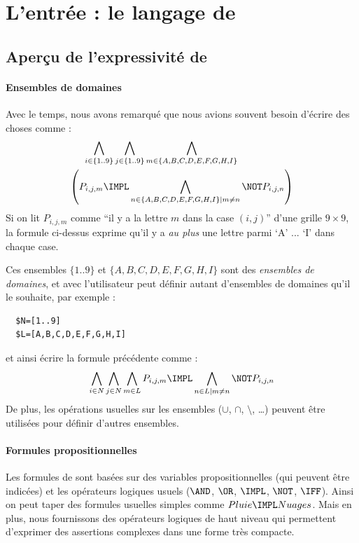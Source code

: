 \section{L'entrée : le langage de \touist}
\subsection{Aperçu de l'expressivité de \touist\label{sec:sat_tobedone}}

\paragraph{Ensembles de domaines}
Avec le temps, nous avons remarqué que nous avions souvent besoin d'écrire des choses comme :
$$\begin{aligned}\bigwedge_{i \in \{1..9\}} \bigwedge_{j \in \{1..9\}}\bigwedge_{ m\in \{A,B,C,D,E,F,G,H,I\}} \hspace{2cm}\\ \left( P_{i,j,m}\IMPL \bigwedge_{n \in \{A,B,C,D,E,F,G,H,I\}|m\neq n}\NOT P_{i,j,n}\right)\end{aligned}$$
Si on lit $P_{i,j,m}$ comme  \enquote{il y a la lettre $m$ dans la case $(i,j)$} d'une grille $9\times 9$, la formule ci-dessus exprime qu'il y a \emph{au plus} une lettre parmi `A' ... `I' dans chaque case.

Ces ensembles $\{1..9\}$ et $\{A,B,C,D,E,F,G,H,I\}$ sont des \emph{ensembles de domaines}, et avec \touist l'utilisateur peut définir autant d'ensembles de domaines qu'il le souhaite, par exemple :

\begin{verbatim}
  $N=[1..9]
  $L=[A,B,C,D,E,F,G,H,I]
\end{verbatim}

et ainsi écrire la formule précédente comme :
$$\bigwedge_{i \in N} \bigwedge_{j \in N}\bigwedge_{ m\in L}P_{i,j,m}\IMPL \bigwedge_{n \in L|m\neq n}\NOT P_{i,j,n}$$
De plus, les opérations usuelles sur les ensembles ($\cup$, $\cap$, $\setminus$, \ldots) peuvent être utilisées pour définir d'autres ensembles.


\paragraph{Formules propositionnelles}

Les formules de \touist sont basées sur des variables propositionnelles (qui peuvent être indicées) et les opérateurs logiques usuels ($\AND$, $\OR$, $\IMPL$, $\NOT$, $\IFF$). Ainsi on peut taper des formules usuelles simples comme $Pluie \IMPL Nuages$. Mais en plus, nous fournissons des opérateurs logiques de haut niveau qui permettent d'exprimer des assertions complexes dans une forme très compacte.

